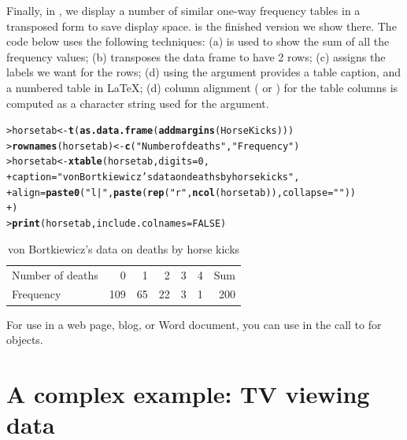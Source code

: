 \documentclass[10pt,krantz2]{krantz}\usepackage[]{graphicx}\usepackage[]{color}
\makeatletter
\newcommand{\hlnum}[1]{\textcolor[rgb]{0.686,0.059,0.569}{#1}}%
\newcommand{\hlstr}[1]{\textcolor[rgb]{0.192,0.494,0.8}{#1}}%
\newcommand{\hlstd}[1]{\textcolor[rgb]{0.345,0.345,0.345}{#1}}%
\newcommand{\hlkwb}[1]{\textcolor[rgb]{0.69,0.353,0.396}{#1}}%
\newcommand{\hlkwc}[1]{\textcolor[rgb]{0.333,0.667,0.333}{#1}}%
\newcommand{\hlkwd}[1]{\textcolor[rgb]{0.737,0.353,0.396}{\textbf{#1}}}%
\newenvironment{kframe}{%
 \def\at@end@of@kframe{}%
 \ifinner\ifhmode%
  \def\at@end@of@kframe{\end{minipage}}%
  \begin{minipage}{\columnwidth}%
 \fi\fi%
 \def\FrameCommand##1{\hskip\@totalleftmargin \hskip-\fboxsep
 \colorbox{shadecolor}{##1}\hskip-\fboxsep
     \hskip-\linewidth \hskip-\@totalleftmargin \hskip\columnwidth}%
 \MakeFramed {\advance\hsize-\width
   \@totalleftmargin\z@ \linewidth\hsize
   \@setminipage}}%
 {\par\unskip\endMakeFramed%
 \at@end@of@kframe}
\makeatother
\begin{document}
Finally, in , we display a number of similar one-way
frequency tables in a transposed form to save display space.
 is the finished version we show there.
The code below uses the following techniques:
(a)  is used to show the sum of all the frequency values;
(b)  transposes the data frame to have 2 rows;
(c)  assigns the labels we want for the rows;
(d) using the  argument provides a table caption, and a numbered
table in \LaTeX;
(d) column alignment ( or ) for the table columns
is computed as a character string used for the  argument.
\begin{kframe}
\begin{alltt}
\hlstd{> }\hlstd{horsetab} \hlkwb{<-} \hlkwd{t}\hlstd{(}\hlkwd{as.data.frame}\hlstd{(}\hlkwd{addmargins}\hlstd{(HorseKicks)))}
\hlstd{> }\hlkwd{rownames}\hlstd{(horsetab)} \hlkwb{<-} \hlkwd{c}\hlstd{(} \hlstr{"Number of deaths"}\hlstd{,} \hlstr{"Frequency"} \hlstd{)}
\hlstd{> }\hlstd{horsetab} \hlkwb{<-} \hlkwd{xtable}\hlstd{(horsetab,} \hlkwc{digits} \hlstd{=} \hlnum{0}\hlstd{,}
\hlstd{+ }     \hlkwc{caption} \hlstd{=} \hlstr{"von Bortkiewicz's data on deaths by horse kicks"}\hlstd{,}
\hlstd{+ }     \hlkwc{align} \hlstd{=} \hlkwd{paste0}\hlstd{(}\hlstr{"l|"}\hlstd{,} \hlkwd{paste}\hlstd{(}\hlkwd{rep}\hlstd{(}\hlstr{"r"}\hlstd{,} \hlkwd{ncol}\hlstd{(horsetab)),} \hlkwc{collapse} \hlstd{=} \hlstr{""}\hlstd{))}
\hlstd{+ }     \hlstd{)}
\hlstd{> }\hlkwd{print}\hlstd{(horsetab,} \hlkwc{include.colnames} \hlstd{=} \hlnum{FALSE}\hlstd{)}
\end{alltt}
\end{kframe}%
\begin{table}[ht]
\centering
\begin{tabular}{l|rrrrrr}
  \hline
  \hline
Number of deaths & 0 & 1 & 2 & 3 & 4 & Sum \\ 
  Frequency & 109 &  65 &  22 &   3 &   1 & 200 \\ 
   \hline
\end{tabular}
\caption{von Bortkiewicz's data on deaths by horse kicks} 
\end{table}


For use in a web page, blog, or Word document, you can use  in the
call to  for  objects.


\section{A complex example: TV viewing data}\label{sec:working-complex}
\end{document}
